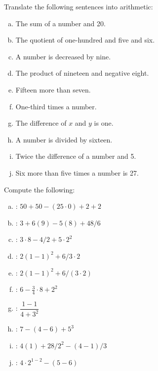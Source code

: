 \documentclass[11pt,letterpaper]{article}
\begin{document}
\newpage



 Translate the following sentences into arithmetic: \pvspace{0.2cm}
        \begin{enumerate}[(a)] \itemsep=2ex
        \item \uans{6cm} \qquad The sum of a number and 20. 
        \item \uans{6cm} \qquad The quotient of one-hundred and five and six.
        \item \uans{6cm} \qquad A number is decreased by nine.
        \item \uans{6cm} \qquad The product of nineteen and negative eight.
        \item \uans{6cm} \qquad Fifteen more than seven.
        \item \uans{6cm} \qquad One-third times a number. 
        \item \uans{6cm} \qquad The difference of $x$ and $y$ is one.
        \item \uans{6cm} \qquad A number is divided by sixteen.
        \item \uans{6cm} \qquad Twice the difference of a number and 5. 
        \item \uans{6cm} \qquad Six more than five times a number is 27.
        \end{enumerate}



\vfill



 Compute the following: \pvspace{0.2cm}
\begin{enumerate}[(a)] \itemsep=2ex
\item \uans{3cm}: \qquad $50 + 50 - (25 \cdot 0) + 2 + 2$
\item \uans{3cm}: \qquad $3 + 6(9) - 5(8) + 48/6$
\item \uans{3cm}: \qquad $3 \cdot 8 - 4/2 + 5 \cdot 2^2$
\item \uans{3cm}: \qquad $2( 1 - 1)^2 + 6/3 \cdot 2$
\item \uans{3cm}: \qquad $2(1 - 1 )^2 + 6/(3 \cdot 2)$
\item \uans{3cm}: \qquad $6 - \frac{3}{4} \cdot 8 + 2^2$
\item \uans{3cm}: \qquad $\dfrac{1 - 1}{4 + 3^2}$
\item \uans{3cm}: \qquad $7 - (4 - 6) + 5^3$
\item \uans{3cm}: \qquad $4(1) + 28/2^2 - (4 - 1)/3$
\item \uans{3cm}: \qquad $4 \cdot 2^{1 - 2} - (5 - 6)$
\end{enumerate}
\end{document}
